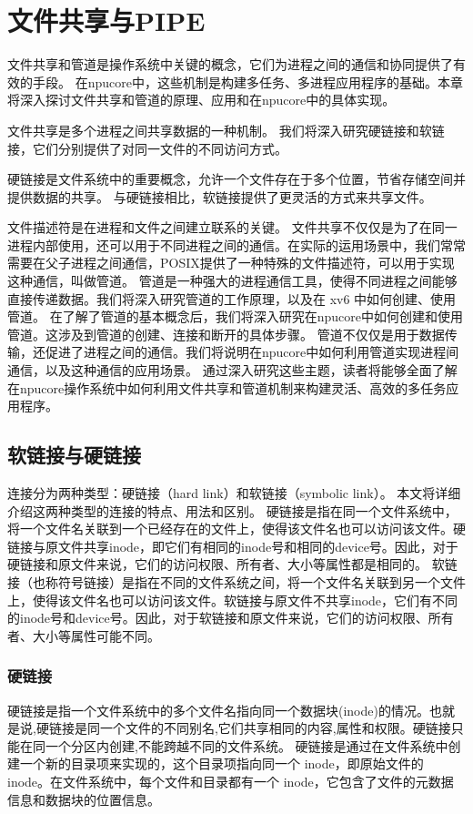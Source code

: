 \section{文件共享与PIPE}
文件共享和管道是操作系统中关键的概念，它们为进程之间的通信和协同提供了有效的手段。
在npucore中，这些机制是构建多任务、多进程应用程序的基础。本章将深入探讨文件共享和管道的原理、应用和在npucore中的具体实现。

文件共享是多个进程之间共享数据的一种机制。
我们将深入研究硬链接和软链接，它们分别提供了对同一文件的不同访问方式。

硬链接是文件系统中的重要概念，允许一个文件存在于多个位置，节省存储空间并提供数据的共享。
与硬链接相比，软链接提供了更灵活的方式来共享文件。

文件描述符是在进程和文件之间建立联系的关键。
文件共享不仅仅是为了在同一进程内部使用，还可以用于不同进程之间的通信。在实际的运用场景中，我们常常需要在父子进程之间通信，POSIX提供了一种特殊的文件描述符，可以用于实现这种通信，叫做管道。
管道是一种强大的进程通信工具，使得不同进程之间能够直接传递数据。我们将深入研究管道的工作原理，以及在 xv6 中如何创建、使用管道。
在了解了管道的基本概念后，我们将深入研究在npucore中如何创建和使用管道。这涉及到管道的创建、连接和断开的具体步骤。
管道不仅仅是用于数据传输，还促进了进程之间的通信。我们将说明在npucore中如何利用管道实现进程间通信，以及这种通信的应用场景。
通过深入研究这些主题，读者将能够全面了解在npucore操作系统中如何利用文件共享和管道机制来构建灵活、高效的多任务应用程序。

\subsection{软链接与硬链接}
连接分为两种类型：硬链接（hard link）和软链接（symbolic link）。
本文将详细介绍这两种类型的连接的特点、用法和区别。
硬链接是指在同一个文件系统中，将一个文件名关联到一个已经存在的文件上，使得该文件名也可以访问该文件。硬链接与原文件共享inode，即它们有相同的inode号和相同的device号。因此，对于硬链接和原文件来说，它们的访问权限、所有者、大小等属性都是相同的。
软链接（也称符号链接）是指在不同的文件系统之间，将一个文件名关联到另一个文件上，使得该文件名也可以访问该文件。软链接与原文件不共享inode，它们有不同的inode号和device号。因此，对于软链接和原文件来说，它们的访问权限、所有者、大小等属性可能不同。
\subsubsection{硬链接}
硬链接是指一个文件系统中的多个文件名指向同一个数据块(inode)的情况。也就是说,硬链接是同一个文件的不同别名,它们共享相同的内容,属性和权限。硬链接只能在同一个分区内创建,不能跨越不同的文件系统。
硬链接是通过在文件系统中创建一个新的目录项来实现的，这个目录项指向同一个 inode，即原始文件的 inode。在文件系统中，每个文件和目录都有一个 inode，它包含了文件的元数据信息和数据块的位置信息。

